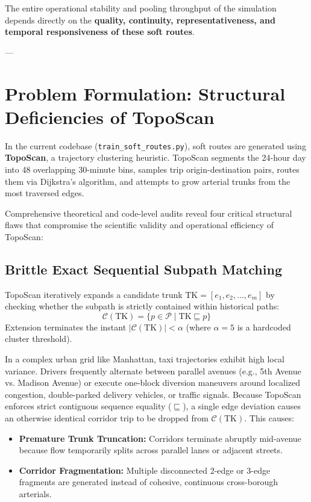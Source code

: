 \documentclass[12pt,a4paper]{article}
\begin{document}
The entire operational stability and pooling throughput of the simulation depends directly on the \textbf{quality, continuity, representativeness, and temporal responsiveness of these soft routes}.

---

\section{Problem Formulation: Structural Deficiencies of TopoScan}

In the current codebase (\texttt{train\_soft\_routes.py}), soft routes are generated using \textbf{TopoScan}, a trajectory clustering heuristic. TopoScan segments the 24-hour day into 48 overlapping 30-minute bins, samples trip origin-destination pairs, routes them via Dijkstra's algorithm, and attempts to grow arterial trunks from the most traversed edges. 

Comprehensive theoretical and code-level audits reveal four critical structural flaws that compromise the scientific validity and operational efficiency of TopoScan:

\subsection{Brittle Exact Sequential Subpath Matching}
TopoScan iteratively expands a candidate trunk $\text{TK} = [e_1, e_2, \dots, e_m]$ by checking whether the subpath is strictly contained within historical paths:
\begin{equation}
\mathcal{C}(\text{TK}) = \{ p \in \mathcal{P} \mid \text{TK} \sqsubseteq p \}
\end{equation}
Extension terminates the instant $|\mathcal{C}(\text{TK})| < \alpha$ (where $\alpha = 5$ is a hardcoded cluster threshold).

In a complex urban grid like Manhattan, taxi trajectories exhibit high local variance. Drivers frequently alternate between parallel avenues (e.g., 5th Avenue vs. Madison Avenue) or execute one-block diversion maneuvers around localized congestion, double-parked delivery vehicles, or traffic signals. Because TopoScan enforces strict contiguous sequence equality ($\sqsubseteq$), a single edge deviation causes an otherwise identical corridor trip to be dropped from $\mathcal{C}(\text{TK})$. This causes:
\begin{itemize}
    \item \textbf{Premature Trunk Truncation:} Corridors terminate abruptly mid-avenue because flow temporarily splits across parallel lanes or adjacent streets.
    \item \textbf{Corridor Fragmentation:} Multiple disconnected 2-edge or 3-edge fragments are generated instead of cohesive, continuous cross-borough arterials.
\end{itemize}
\end{document}
